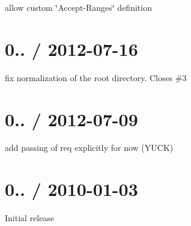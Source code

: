 \begin{DoxyItemize}
\item allow custom \char`\"{}\+Accept-\/\+Ranges\char`\"{} definition
\end{DoxyItemize}

\section*{0.. / 2012-\/07-\/16 }


\begin{DoxyItemize}
\item fix normalization of the root directory. Closes \#3
\end{DoxyItemize}

\section*{0.. / 2012-\/07-\/09 }


\begin{DoxyItemize}
\item add passing of req explicitly for now (Y\+U\+C\+K)
\end{DoxyItemize}

\section*{0.. / 2010-\/01-\/03 }


\begin{DoxyItemize}
\item Initial release 
\end{DoxyItemize}